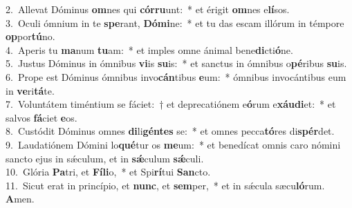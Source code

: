{2.~}Allevat Dóminus \textbf{om}nes qui \textbf{cór}\textbf{ru}unt:~* et érigit \textbf{om}nes e\textbf{lí}sos.\\
{3.~}Oculi ómnium in te \textbf{spe}rant, \textbf{Dó}\textbf{mi}ne:~* et tu das escam illórum in témpore \textbf{op}por\textbf{tú}no.\\
{4.~}Aperis tu \textbf{ma}num \textbf{tu}am:~* et imples omne ánimal bene\textbf{di}cti\textbf{ó}ne.\\
{5.~}Justus Dóminus in ómnibus \textbf{vi}is \textbf{su}is:~* et sanctus in ómnibus o\textbf{pé}ribus \textbf{su}is.\\
{6.~}Prope est Dóminus ómnibus invo\textbf{cán}tibus \textbf{e}um:~* ómnibus invocántibus eum in \textbf{ve}ri\textbf{tá}te.\\
{7.~}Voluntátem timéntium se fáciet:~† et deprecatiónem e\textbf{ó}rum e\textbf{xáu}\textbf{di}et:~* et salvos \textbf{fá}ciet \textbf{e}os.\\
{8.~}Custódit Dóminus omnes \textbf{di}li\textbf{gén}\textbf{tes} se:~* et omnes pecca\textbf{tó}res di\textbf{spér}det.\\
{9.~}Laudatiónem Dómini lo\textbf{qué}tur os \textbf{me}um:~* et benedícat omnis caro nómini sancto ejus in sǽculum, et in \textbf{sǽ}culum \textbf{sǽ}culi.\\
{10.~}Glória \textbf{Pa}tri, et \textbf{Fí}\textbf{li}o,~* et Spi\textbf{rí}tui \textbf{San}cto.\\
{11.~}Sicut erat in princípio, et \textbf{nunc}, et \textbf{sem}per,~* et in sǽcula sæcu\textbf{ló}rum. \textbf{A}men.\\
